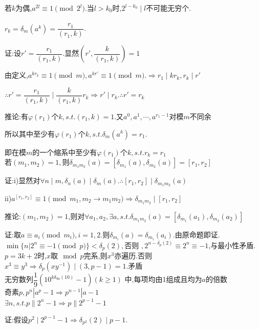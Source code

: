 若$ k$为偶,$ a^{2l}\equiv 1 \pmod{2^l}.$当$ l>k_0$时,$ 2^{l-k_0}\mid l$不可能无穷个.
\\
\\
$ r_k=\delta_m(a^k)=\dfrac{r_1}{(r_1,k)}$.

证:设$ r'=\dfrac{r_1}{(r_1,k)}$.显然$ (r',\dfrac{k}{(r_1,k)})=1$

由定义,$ a^{kr_k}\equiv 1 \pmod m, a^{kr'}\equiv 1 \pmod m. \Rightarrow  r_1 \mid kr_k,r_k\mid r'$

$ \therefore r' =\dfrac{r_1}{(r_1,k)}\mid \dfrac{k}{(r_1,k)}r_k\Rightarrow r' \mid r_k. \therefore r'=r_k$

推论:有$ \varphi(r_1)$个$ k,s.t.(r_1,k)=1.$又$ a^0,a^1,\cdots,a^{r_1-1}$对模$ m$不同余

所以其中至少有$ \varphi(r_1)$个$ k,s.t.\delta_m(a^k)=r_1$.

即在模$ m$的一个缩系中至少有$ \varphi(r_1)$个$ k,s.t.r_k=r_1$
\\

若$ (m_1,m_2)=1,$则$ \delta_{m_1m_2}(a)=[\delta_{m_1}(a),\delta_{m_2}(a)]=[r_1,r_2]$

证:i)显然对$ \forall n \mid m,\delta_n(a)\mid \delta_m(a). \therefore [r_1,r_2] \mid \delta_{m_1m_2}(a)$ 

ii)$ a^{[r_1,r_2]}\equiv 1 \pmod{m_1,m_2 \rightarrow m_1m_2}\Rightarrow \delta_{m_1m_2}\mid [r_1,r_2]$

推论:$ (m_1,m_2)=1$,则对$ \forall a_1,a_2,\exists a,s.t.\delta_{m_1m_2}(a)=[\delta_{m_1}(a_1),\delta_{m_2}(a_2)]$

证:取$ a\equiv a_i \pmod{m_i},i=1,2$.则$ \delta_{m_i}(a)=\delta_{m_i}(a_i)$.由原命题即证.
\\

$ \min\{ n|2^n\equiv -1 \pmod p\}<\delta_p(2),$否则 $,2^{n-\delta_p(2)}\equiv 2^n \equiv -1$,与最小性矛盾.
\\

$ p=3k+2$时,$ x$取$ \mod p$完系,则$ x^3$亦遍历.否则$ x^3\equiv y^3\Rightarrow \delta_p(xy^{-1})\mid(3,p-1)=1$.矛盾
\\

无穷数列$  \dfrac{1}{9}(10^{k\delta_{9a}(10)}-1)(k\ge1) $ 中,每项均由1组成且均为$ a$的倍数
\\

奇素$ p,p^n|a^p-1\Rightarrow p^{n-1}|a-1$
\\

$ \exists n,s.t.p\parallel2^n-1\Rightarrow p\parallel 2^{p-1}-1$

证:假设$ p^2 \mid 2^{p-1}-1\Rightarrow \delta_{p^2}(2)\mid p-1.$

